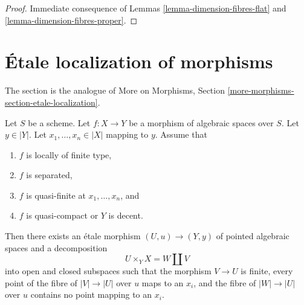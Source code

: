 \begin{proof}
Immediate consequence of
Lemmas \ref{lemma-dimension-fibres-flat} and
\ref{lemma-dimension-fibres-proper}.
\end{proof}









\section{\'Etale localization of morphisms}
\label{section-etale-localization}

\noindent
The section is the analogue of
More on Morphisms, Section \ref{more-morphisms-section-etale-localization}.

\begin{lemma}
\label{lemma-etale-splits-off-quasi-finite-part}
Let $S$ be a scheme.
Let $f : X \to Y$ be a morphism of algebraic spaces over $S$.
Let $y \in |Y|$. Let $x_1, \ldots, x_n \in |X|$ mapping to $y$.
Assume that
\begin{enumerate}
\item $f$ is locally of finite type,
\item $f$ is separated,
\item $f$ is quasi-finite at $x_1, \ldots, x_n$, and
\item $f$ is quasi-compact or $Y$ is decent.
\end{enumerate}
Then there exists an \'etale morphism $(U, u) \to (Y, y)$
of pointed algebraic spaces and a decomposition
$$
U \times_Y X = W \amalg V
$$
into open and closed subspaces such that the morphism $V \to U$ is finite,
every point of the fibre of $|V| \to |U|$ over $u$ maps to an $x_i$,
and the fibre of $|W| \to |U|$ over $u$ contains no point mapping to an
$x_i$.
\end{lemma}

